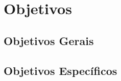 


	\section{Objetivos}

	\subsection{Objetivos Gerais} %
	\label{sub:objetivos_gerais}
	

	\subsection{Objetivos Específicos} %
	\label{sub:objetivos_específicos}
	
